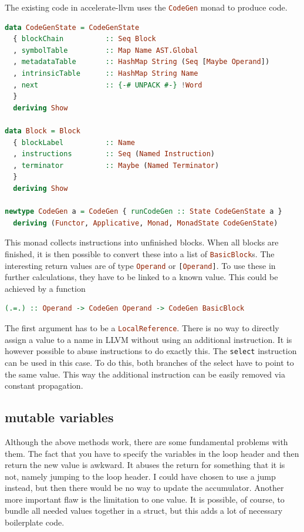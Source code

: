 \documentclass[a4paper,bibliography=totocnumbered,parskip,headsepline]{scrbook}
\begin{document}
The existing code in accelerate-llvm uses the \lstinline[language=haskell]!CodeGen! monad to produce code.
\begin{lstlisting}[language=haskell]
data CodeGenState = CodeGenState
  { blockChain          :: Seq Block
  , symbolTable         :: Map Name AST.Global
  , metadataTable       :: HashMap String (Seq [Maybe Operand])
  , intrinsicTable      :: HashMap String Name
  , next                :: {-# UNPACK #-} !Word
  }
  deriving Show

data Block = Block
  { blockLabel          :: Name
  , instructions        :: Seq (Named Instruction)
  , terminator          :: Maybe (Named Terminator)
  }
  deriving Show

newtype CodeGen a = CodeGen { runCodeGen :: State CodeGenState a }
  deriving (Functor, Applicative, Monad, MonadState CodeGenState)
\end{lstlisting}

This monad collects instructions into unfinished blocks.
When all blocks are finished, it is then possible to convert these into a list of \lstinline[language=haskell]!BasicBlock!s.
The interesting return values are of type \lstinline[language=haskell]!Operand! or \lstinline[language=haskell]![Operand]!.
To use these in further calculations, they have to be linked to a known value.
This could be achieved by a function
\begin{lstlisting}[language=haskell]
(.=.) :: Operand -> CodeGen Operand -> CodeGen BasicBlock
\end{lstlisting}
The first argument has to be a \lstinline[language=haskell]!LocalReference!.
There is no way to directly assign a value to a name in LLVM without using an additional instruction.
It is however possible to abuse instructions to do exactly this.
The \lstinline!select! instruction can be used in this case.
To do this, both branches of the select have to point to the same value.
This way the additional instruction can be easily removed via constant propagation.



\subsection{mutable variables}
Although the above methods work, there are some fundamental problems with them.
The fact that you have to specify the variables in the loop header and then return the new value is awkward.
It abuses the return for something that it is not, namely jumping to the loop header.
I could have chosen to use a jump instead, but then there would be no way to update the accumulator.
Another more important flaw is the limitation to one value.
It is possible, of course, to bundle all needed values together in a struct, but this adds a lot of necessary boilerplate code.
\end{document}
